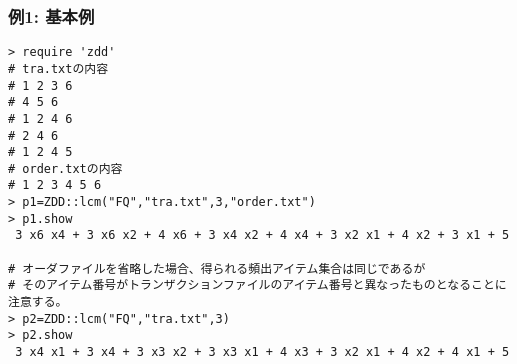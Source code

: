 \subsubsection*{例1: 基本例}



\begin{Verbatim}[baselinestretch=0.7,frame=single]
> require 'zdd'
# tra.txtの内容
# 1 2 3 6
# 4 5 6
# 1 2 4 6
# 2 4 6
# 1 2 4 5
# order.txtの内容
# 1 2 3 4 5 6
> p1=ZDD::lcm("FQ","tra.txt",3,"order.txt")
> p1.show
 3 x6 x4 + 3 x6 x2 + 4 x6 + 3 x4 x2 + 4 x4 + 3 x2 x1 + 4 x2 + 3 x1 + 5

# オーダファイルを省略した場合、得られる頻出アイテム集合は同じであるが
# そのアイテム番号がトランザクションファイルのアイテム番号と異なったものとなることに注意する。
> p2=ZDD::lcm("FQ","tra.txt",3)
> p2.show
 3 x4 x1 + 3 x4 + 3 x3 x2 + 3 x3 x1 + 4 x3 + 3 x2 x1 + 4 x2 + 4 x1 + 5
\end{Verbatim}
